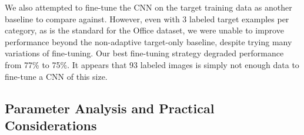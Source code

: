 
 


We also attempted to fine-tune the CNN on the target training data as another
baseline to compare against. However, even with 3 labeled target examples per
category, as is the standard for the Office dataset, we were unable to improve
performance beyond the non-adaptive target-only baseline, despite trying many
variations of fine-tuning. Our best fine-tuning strategy degraded performance
from 77\% to 75\%. It appears that 93 labeled images is simply not enough data
to fine-tune a CNN of this size.

\subsection{Parameter Analysis and Practical Considerations}
\label{sec:analysis}




